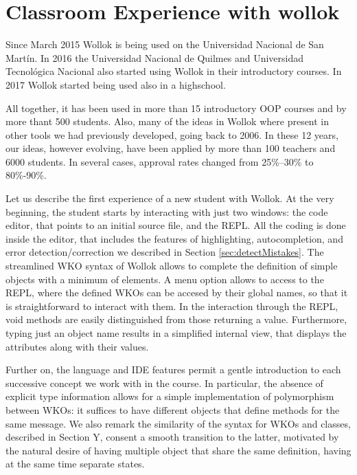 \section{Classroom Experience with wollok}
\label{experience}

Since March 2015 Wollok is being used on the Universidad Nacional de San Martín. 
In 2016 the Universidad Nacional de Quilmes and Universidad Tecnológica Nacional also started using Wollok in their introductory courses.
In 2017 Wollok started being used also in a highschool. 

All together, it has been used in more than 15 introductory OOP courses and by more thant 500 students.
Also, many of the ideas in Wollok where present in other tools we had previously developed, going back to 2006. In these 12 years, our ideas, however evolving, have been applied by more than 100 teachers and 6000 students. 
In several cases, approval rates changed from 25\%--30\% to 80\%-90\%.

Let us describe the first experience of a new student with Wollok.
At the very beginning, the student starts by interacting with just two windows: the code editor, that points to an initial source file, and the REPL.
All the coding is done inside the editor, that includes the features of highlighting, autocompletion, and error detection/correction we described in Section \ref{sec:detectMistakes}. The streamlined WKO syntax of Wollok allows to complete the definition of simple objects with a minimum of elements. A menu option allows to access to the REPL, where the defined WKOs can be accesed by their global names, so that it is straightforward to interact with them. In the interaction through the REPL, void methods are easily distinguished from those returning a value. Furthermore, typing just an object name results in a simplified internal view, that displays the attributes along with their values.

Further on, the language and IDE features permit a gentle introduction to each successive concept we work with in the course. 
In particular, the absence of explicit type information allows for a simple implementation of polymorphism between WKOs: it suffices to have different objects that define methods for the same message.
We also remark the similarity of the syntax for WKOs and classes, described in Section Y, consent a smooth transition to the latter, motivated by the natural desire of having multiple object that share the same definition, having at the same time separate states.

